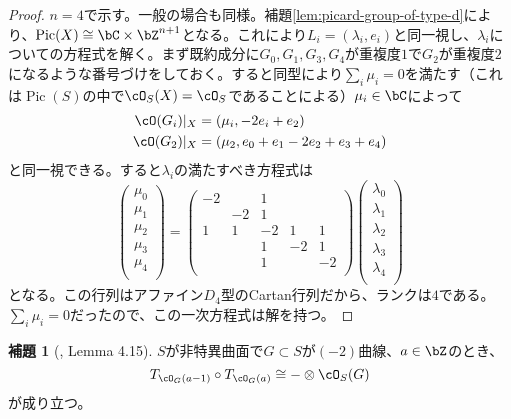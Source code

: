\documentclass[uplatex, a4paper, dvipdfmx]{jsarticle}
\theoremstyle{definition}
\newtheorem{lemma}[theorem]{補題}
\DeclareMathOperator{\Pic}{\mathrm{Pic}}
\begin{document}
\begin{proof}
    $n=4$で示す。一般の場合も同様。補題\ref{lem:picard-group-of-type-d}により、$\Pic(X) \cong \bC \times \bZ^{n+1}$となる。これにより$L_i = (\lambda_i, e_i)$と同一視し、$\lambda_i$についての方程式を解く。まず既約成分に$G_0, G_1, G_{3}, G_4$が重複度$1$で$G_2$が重複度$2$になるような番号づけをしておく。すると同型により$\sum_i \mu_i = 0$を満たす（これは$\Pic(S)$の中で$\cO_S(X) = \cO_S$であることによる）$\mu_i \in \bC$によって
    \begin{align}
        \cO(G_i)\vert_X & = (\mu_i, -2e_i + e_2)                 \\
        \cO(G_2)\vert_X & = (\mu_2, e_0 + e_1 -2e_2 + e_3 + e_4)
    \end{align}
    と同一視できる。すると$\lambda_i$の満たすべき方程式は
    \begin{equation}
        \begin{pmatrix}
            \mu_0 \\
            \mu_1 \\
            \mu_2 \\
            \mu_3 \\
            \mu_4 \\
        \end{pmatrix}
        =
        \begin{pmatrix}
            -2 &    & 1  &    &    \\
               & -2 & 1  &    &    \\
            1  & 1  & -2 & 1  & 1  \\
               &    & 1  & -2 & 1  \\
               &    & 1  &    & -2 \\
        \end{pmatrix}
        \begin{pmatrix}
            \lambda_0 \\
            \lambda_1 \\
            \lambda_2 \\
            \lambda_3 \\
            \lambda_4 \\
        \end{pmatrix}
    \end{equation}
    となる。この行列はアファイン$D_4$型のCartan行列だから、ランクは$4$である。$\sum_i \mu_i = 0$だったので、この一次方程式は解を持つ。
\end{proof}
\begin{lemma}[{\cite{MR2198807}, Lemma 4.15}]\label{lem:composition-of-twists}
    $S$が非特異曲面で$G \subset S$が$(-2)$曲線、$a \in \bZ$のとき、
    \begin{equation}
        T_{\cO_G(a-1)}\circ T_{\cO_G(a)} \cong -\otimes \cO_S(G)
    \end{equation}
    が成り立つ。
\end{lemma}
\end{document}
